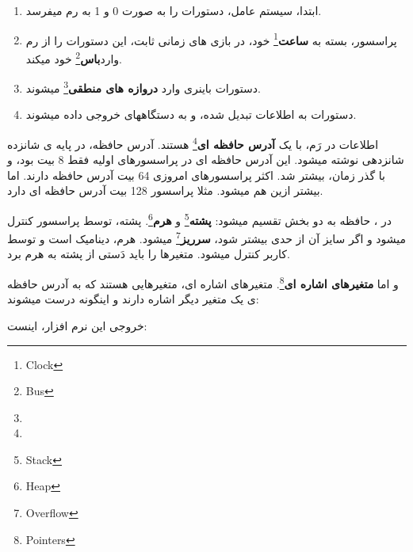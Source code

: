 \documentclass[14pt,a4paper]{memoir}
\begin{document}
	 \begin{enumerate}
	 	\item ابتدا، سیستم عامل، دستورات را به صورت 0 و 1 به رم میفرسد.
	 	\item پراسسور، بسته به \textbf{ساعت}\footnote{Clock} خود، در بازی های زمانی ثابت، این دستورات را از رم وارد\textbf{باس}\footnote{Bus} خود میکند.
	 	\item دستورات باینری وارد \textbf{دروازه های منطقی}\footnote{} میشوند.
	 	\item دستورات به اطلاعات تبدیل شده، و به دستگاههای خروجی داده میشوند.
 	 \end{enumerate}
  
  اطلاعات در رَم، با یک \textbf{آدرس حافظه ای}\footnote{} هستند. آدرس حافظه، در پایه ی شانزده شانزدهی نوشته میشود. این آدرس حافظه ای در پراسسورهای اولیه فقط 8 بیت بود، و با گذر زمان، بیشتر شد. اکثر پراسسورهای امروزی 64 بیت آدرس حافظه دارند. اما بیشتر ازین هم میشود. مثلا پراسسور  128 بیت آدرس حافظه ای دارد.
  
  در ، حافظه به دو بخش تقسیم میشود: \textbf{پشته}\footnote{Stack} و \textbf{هرم}\footnote{Heap}. پشته، توسط پراسسور کنترل میشود و اگر سایز آن از حدی بیشتر شود، \textbf{سرریز}\footnote{Overflow} میشود. هرم، دینامیک است و توسط کاربر کنترل میشود. متغیرها را باید دَستی از پشته به هرم برد.
  
  و اما \textbf{متغیرهای اشاره ای}\footnote{Pointers}. متغیرهای اشاره ای، متغیرهایی هستند که به آدرس حافظه ی یک متغیر دیگر اشاره دارند و اینگونه درست میشوند: 
	 
	 
	 
	 \begin{latin}
	 	
	 \end{latin}
	 
	 
خروجی این نرم افزار، اینست:


	 \begin{latin}
	\mono\color{white}{	\begin{lstlisting}[backgroundcolor = \color{black}]

'i' is: 41; The memory address of it is 00CFFCB8
And by adding * to ip we 'dereference' it like so: 41
	
		
		\end{lstlisting}}	 
	
\end{latin}
\end{document}
